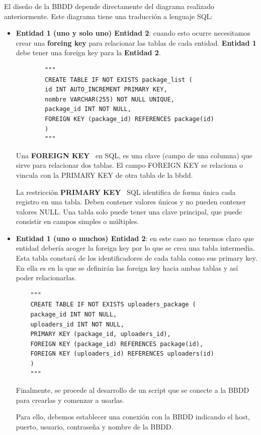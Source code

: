 \documentclass[a4paper, 12pt]{book}
\begin{document}
El diseño de la BBDD depende directamente del diagrama realizado anteriormente. 
Este diagrama tiene una traducción a lenguaje SQL:
\begin{itemize}
	\item \textbf {Entidad 1 (uno y solo uno) Entidad 2}: cuando esto ocurre necesitamos crear una \textbf {foreing key} para relacionar las tablas de cada entidad. \textbf {Entidad 1} debe tener una foreign key para la \textbf {Entidad 2}.
	
	\begin{verbatim}
		"""
		CREATE TABLE IF NOT EXISTS package_list (
		id INT AUTO_INCREMENT PRIMARY KEY,
		nombre VARCHAR(255) NOT NULL UNIQUE,
		package_id INT NOT NULL,
		FOREIGN KEY (package_id) REFERENCES package(id)
		)
		"""
	\end{verbatim}
	
	Una \textbf {FOREIGN KEY}~\cite{thedataschool:_foreingkey} en SQL, es una clave (campo de una columna) que sirve para relacionar dos tablas. El campo FOREIGN KEY se relaciona o vincula con la PRIMARY KEY de otra tabla de la bbdd.
	
	La restricción \textbf {PRIMARY KEY}~\cite{thedataschool:_primarykey} SQL identifica de forma única cada registro en una tabla.
	Deben contener valores únicos y no pueden contener valores NULL.
	Una tabla solo puede tener una clave principal, que puede consistir en campos simples o múltiples.
	
	\item \textbf {{Entidad 1 (uno o muchos) Entidad 2}}: en este caso no tenemos claro que entidad debería acoger la foreign key por lo que se crea una tabla intermedia.
	Esta tabla constará de los identificadores de cada tabla como sus primary key.
	En ella es en la que se definirán las foreign key hacia ambas tablas y así poder relacionarlas.
	
	\begin{verbatim}
	"""
	CREATE TABLE IF NOT EXISTS uploaders_package (
	package_id INT NOT NULL,
	uploaders_id INT NOT NULL,
	PRIMARY KEY (package_id, uploaders_id),
	FOREIGN KEY (package_id) REFERENCES package(id),
	FOREIGN KEY (uploaders_id) REFERENCES uploaders(id)
	)
	"""
	\end{verbatim}
	
	Finalmente, se procede al desarrollo de un script que se conecte a la BBDD para crearlas y comenzar a usarlas.
	
	Para ello, debemos establecer una conexión con la BBDD indicando el host, puerto, usuario, contraseña y nombre de la BBDD.
	

\end{itemize}
\end{document}
